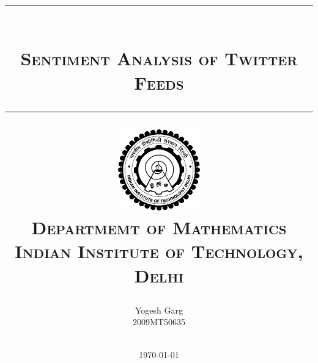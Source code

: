 \title{
	\rule{0.75\textwidth}{.4pt}\\ \vspace{10pt}
	\textsc{
		Sentiment Analysis of Twitter Feeds
	}\\
	\rule{0.75\textwidth}{.4pt}
\vfill
	\includegraphics[height=100pt]{img/iitd_logo.png}\\
\vspace{10pt}
	\textsc{\Large{
		Departmemt of Mathematics\\
		Indian Institute of Technology, Delhi
	}}
\vspace{100pt}
}

\author{
	Yogesh Garg\\
	\small{2009MT50635}\\
	\rule{0.75\textwidth}{.4pt}
}

\date{\today}

\clearpage\maketitle
\thispagestyle{empty}
\setcounter{page}{0}